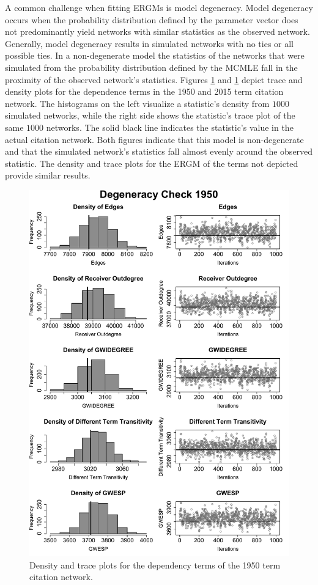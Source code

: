 \documentclass[headsepline=true, abstracton]{scrartcl}
\begin{document}
A common challenge when fitting ERGMs is model degeneracy. Model degeneracy occurs when the probability distribution defined by the parameter vector does not predominantly yield networks with similar statistics as the observed network. Generally, model degeneracy results in simulated networks with no ties or all possible ties. In a non-degenerate model the statistics of the networks that were simulated from the probability distribution defined by the MCMLE fall in the proximity of the observed network's statistics. Figures \ref{mcmcdiagnostics_1950} and \ref{mcmcdiagnostics_1950} depict trace and density plots for the dependence terms in the 1950 and 2015 term citation network. The histograms on the left visualize a statistic's density from $1000$ simulated networks, while the right side shows the statistic's trace plot of the same $1000$ networks. The solid black line indicates the statistic's value in the actual citation network. Both figures indicate that this model is non-degenerate and that the simulated network's statistics fall almost evenly around the observed statistic. The density and trace plots for the ERGM of the terms not depicted provide similar results.

\begin{figure}[H]
 \begin{center}
\includegraphics[width=14.5cm]{Deg_1950}
\caption{Density and trace plots for the dependency terms of the 1950 term citation network.}
 \label{mcmcdiagnostics_1950}
\vspace{-.25cm}
\end{center}
\end{figure} 
\end{document}
